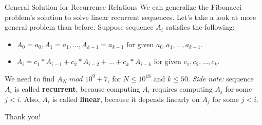 \documentclass{beamer}
\begin{document}
\begin{frame}{General Solution for Recurrence Relations}
  We can generalize the Fibonacci problem's solution to solve linear recurrent sequences.
  \pause \newline
  Let's take a look at more general problem than before. Suppose sequence $A_i$ satisfies the following:
  \begin{itemize}
    \item $A_0 = a_0, A_1 = a_1, ..., A_{k-1} = a_{k-1}$ for given $a_0, a_1, ..., a_{k-1}$.
      \pause
    \item $A_i = c_1 * A_{i-1} + c_2 * A_{i-2} + ... + c_k * A_{i-k}$ for given $c_1, c_2, ..., c_k$.      
  \end{itemize}
  \pause
  We need to find $A_N$ $mod$ $10^9 + 7$, for $N \leq 10^{18}$ and $k \leq 50$.
  \pause \newline \newline
  \textit{Side note:} sequence $A_i$ is called \textbf{recurrent}, because computing $A_i$
  requires computing $A_j$ for some $j < i$. Also, $A_i$ is called \textbf{linear},
  because it depends linearly on $A_j$ for some $j < i$.
\end{frame}

\begin{frame}{}
		\LARGE{\centerline{Thank you!}}
\end{frame}
\end{document}

